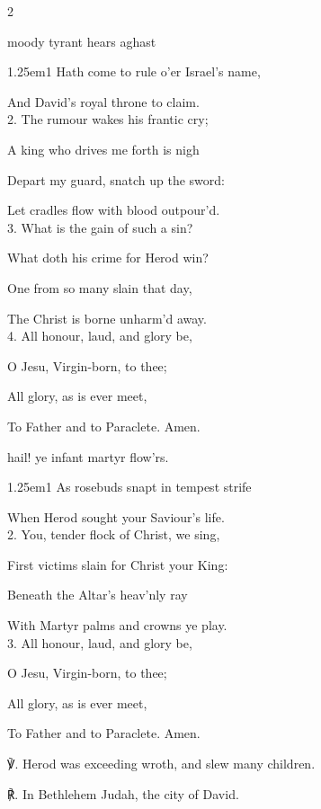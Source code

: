 \begin{paracol}{2}
\mattinsInvitatoryHymn\label{HolyInnocentsInvitatoryHymn}

 moody tyrant hears aghast

\begin{hangparas}{1.25em}{1}
Hath come to rule o'er Israel's name,

And David's royal throne to claim.\\

2. The rumour wakes his frantic cry;

A king who drives me forth is nigh

Depart my guard, snatch up the sword:

Let cradles flow with blood outpour'd.\\

3. What is the gain of such a sin?

What doth his crime for Herod win?

One from so many slain that day,

The Christ is borne unharm'd away.\\

4. All honour, laud, and glory be,

O Jesu, Virgin-born, to thee;

All glory, as is ever meet,

To Father and to Paraclete. Amen.
\end{hangparas}

\switchcolumn

\mattinsOfficeHymn\label{HolyInnocentsMattinsHymn}

 hail! ye infant martyr flow'rs.

\begin{hangparas}{1.25em}{1}
As rosebuds snapt in tempest strife

When Herod sought your Saviour's life.\\

2. You, tender flock of Christ, we sing,

First victims slain for Christ your King:

Beneath the Altar's heav'nly ray

With Martyr palms and crowns ye play.\\

3. All honour, laud, and glory be,

O Jesu, Virgin-born, to thee;

All glory, as is ever meet,

To Father and to Paraclete. Amen.\\
\end{hangparas}

℣. Herod was exceeding wroth, and slew many children.

℟. In Bethlehem Judah, the city of David.


\end{paracol}

